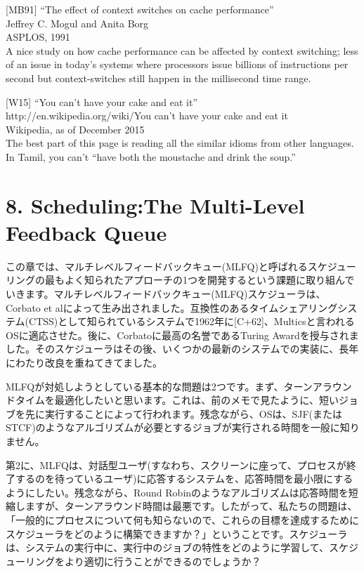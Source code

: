 {[}MB91{]} ``The effect of context switches on cache performance''\\
Jeffrey C. Mogul and Anita Borg\\
ASPLOS, 1991\\
A nice study on how cache performance can be affected by context
switching; less of an issue in today's systems where processors issue
billions of instructions per second but context-switches still happen in
the millisecond time range.

{[}W15{]} ``You can't have your cake and eat it''\\
http://en.wikipedia.org/wiki/You can't have your cake and eat it\\
Wikipedia, as of December 2015\\
The best part of this page is reading all the similar idioms from other
languages. In Tamil, you can't ``have both the moustache and drink the
soup.''

\newpage

\hypertarget{schedulingthe-multi-level-feedback-queue}{%
\section*{8. Scheduling:The Multi-Level Feedback
Queue}\label{schedulingthe-multi-level-feedback-queue}}

この章では、マルチレベルフィードバックキュー(MLFQ)と呼ばれるスケジューリングの最もよく知られたアプローチの1つを開発するという課題に取り組んでいきます。マルチレベルフィードバックキュー(MLFQ)スケジューラは、Corbato
et
alによって生み出されました。互換性のあるタイムシェアリングシステム(CTSS)として知られているシステムで1962年に{[}C+62{]}、Multicsと言われるOSに適応させた。後に、Corbatoに最高の名誉であるTuring
Awardを授与されました。そのスケジューラはその後、いくつかの最新のシステムでの実装に、長年にわたり改良を重ねてきてました。

MLFQが対処しようとしている基本的な問題は2つです。まず、ターンアラウンドタイムを最適化したいと思います。これは、前のメモで見たように、短いジョブを先に実行することによって行われます。残念ながら、OSは、SJF(またはSTCF)のようなアルゴリズムが必要とするジョブが実行される時間を一般に知りません。

第2に、MLFQは、対話型ユーザ(すなわち、スクリーンに座って、プロセスが終了するのを待っているユーザ)に応答するシステムを、応答時間を最小限にするようにしたい。残念ながら、Round
Robinのようなアルゴリズムは応答時間を短縮しますが、ターンアラウンド時間は最悪です。したがって、私たちの問題は、「一般的にプロセスについて何も知らないので、これらの目標を達成するためにスケジューラをどのように構築できますか？」ということです。スケジューラは、システムの実行中に、実行中のジョブの特性をどのように学習して、スケジューリングをより適切に行うことができるのでしょうか？

